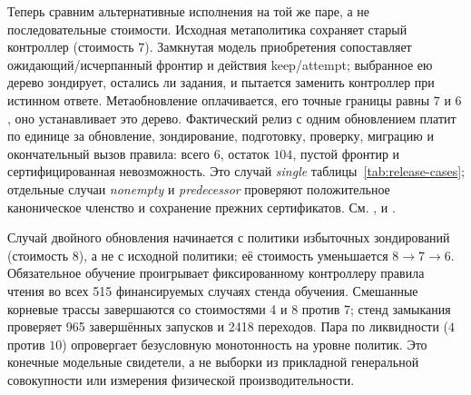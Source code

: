 Теперь сравним альтернативные исполнения на той же паре, а не последовательные стоимости. Исходная метаполитика сохраняет старый контроллер (стоимость $7$). Замкнутая модель приобретения сопоставляет ожидающий/исчерпанный фронтир и действия keep/attempt; выбранное ею дерево зондирует, остались ли задания, и пытается заменить контроллер при истинном ответе. Метаобновление оплачивается, его точные границы равны $7$ и $6$, оно устанавливает это дерево. Фактический релиз с одним обновлением платит по единице за обновление, зондирование, подготовку, проверку, миграцию и окончательный вызов правила: всего $6$, остаток $104$, пустой фронтир и сертифицированная невозможность. Это случай \emph{single} таблицы~\ref{tab:release-cases}; отдельные случаи \emph{nonempty} и \emph{predecessor} проверяют положительное каноническое членство и сохранение прежних сертификатов. См. ,  и .

Случай двойного обновления начинается с политики избыточных зондирований (стоимость $8$), а не с исходной политики; её стоимость уменьшается $8\to7\to6$. Обязательное обучение проигрывает фиксированному контроллеру правила чтения во всех 515 финансируемых случаях стенда обучения. Смешанные корневые трассы завершаются со стоимостями 4 и 8 против 7; стенд замыкания проверяет 965 завершённых запусков и 2418 переходов. Пара по ликвидности ($4$ против $10$) опровергает безусловную монотонность на уровне политик. Это конечные модельные свидетели, а не выборки из прикладной генеральной совокупности или измерения физической производительности.

\newpage
